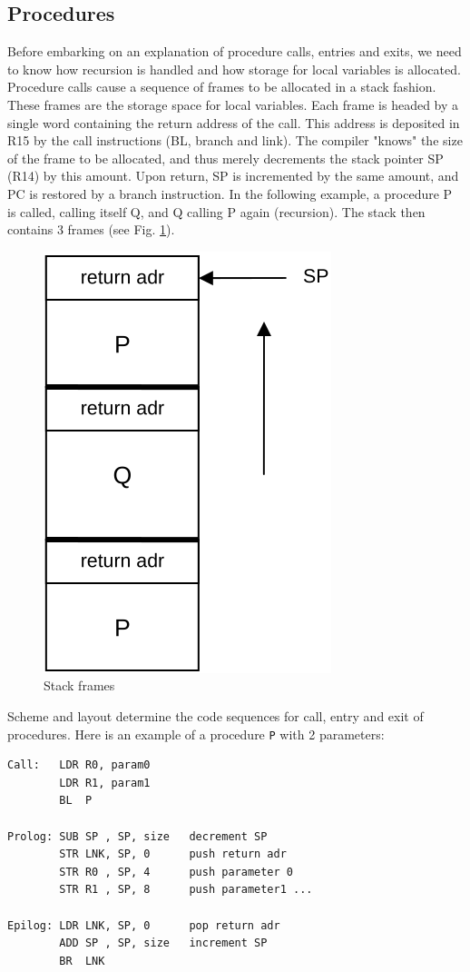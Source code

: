 \subsection{Procedures}
Before embarking on an explanation of procedure calls, entries and exits, we need to know how
recursion is handled and how storage for local variables is allocated. Procedure calls cause a
sequence of frames to be allocated in a stack fashion. These frames are the storage space for local
variables. Each frame is headed by a single word containing the return address of the call. This
address is deposited in R15 by the call instructions (BL, branch and link). The compiler "knows" the
size of the frame to be allocated, and thus merely decrements the stack pointer SP (R14) by this
amount. Upon return, SP is incremented by the same amount, and PC is restored by a branch
instruction. In the following example, a procedure P is called, calling itself Q, and Q calling P again
(recursion). The stack then contains 3 frames (see Fig. \ref{fig:stackfrm}).
\begin{figure}[h!]
  \centering
  \includegraphics[width=.4\textwidth]{i/C/8.png}
  \caption{Stack frames}
  \label{fig:stackfrm}
\end{figure}

Scheme and layout determine the code sequences for call, entry and exit of procedures. Here is an
example of a procedure \verb|P| with 2 parameters:
\begin{verbatim}
Call:   LDR R0, param0   
        LDR R1, param1
        BL  P
        
Prolog: SUB SP , SP, size   decrement SP        
        STR LNK, SP, 0      push return adr
        STR R0 , SP, 4      push parameter 0
        STR R1 , SP, 8      push parameter1 ...
                           
Epilog: LDR LNK, SP, 0      pop return adr
        ADD SP , SP, size   increment SP
        BR  LNK
\end{verbatim}

